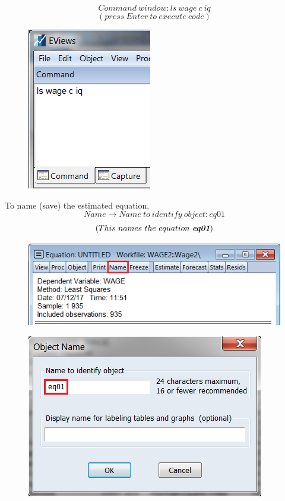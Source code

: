\documentclass[12pt]{report}
\begin{document}
$$Command\ window: ls\ wage\ c\ iq$$
$$(press\ Enter\ to\ execute\ code)$$
\begin{figure}[H]
	\centering
	\includegraphics{q3_13}
\end{figure}
\vspace{-\baselineskip}
\noindent To name (save) the estimated equation,
$$Name \to Name\ to\ identify\ object: eq01$$
$$(This\ names\ the\ equation\ \textit{\textbf{eq01}})$$
\begin{figure}[H]
	\centering
	\includegraphics{q3_14}
\end{figure}
\vspace{-\baselineskip}
\begin{figure}[H]
	\centering
	\includegraphics{q3_15}
\end{figure}
\end{document}
